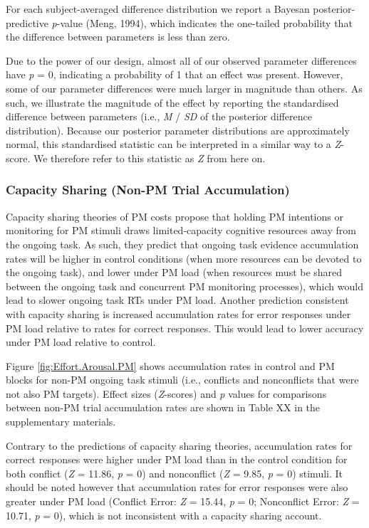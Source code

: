 \documentclass[11pt,]{article}
\begin{document}
For each subject-averaged difference distribution we report a Bayesan
posterior-predictive \emph{p}-value (Meng, 1994), which indicates the
one-tailed probability that the difference between parameters is less
than zero.

Due to the power of our design, almost all of our observed parameter
differences have \emph{p} = 0, indicating a probability of 1 that an
effect was present. However, some of our parameter differences were much
larger in magnitude than others. As such, we illustrate the magnitude of
the effect by reporting the standardised difference between parameters
(i.e., \emph{M} / \emph{SD} of the posterior difference distribution).
Because our posterior parameter distributions are approximately normal,
this standardised statistic can be interpreted in a similar way to a
\emph{Z}-score. We therefore refer to this statistic as \emph{Z} from
here on.

\subsubsection{Capacity Sharing (Non-PM Trial
Accumulation)}\label{capacity-sharing-non-pm-trial-accumulation}

Capacity sharing theories of PM costs propose that holding PM intentions
or monitoring for PM stimuli draws limited-capacity cognitive resources
away from the ongoing task. As such, they predict that ongoing task
evidence accumulation rates will be higher in control conditions (when
more resources can be devoted to the ongoing task), and lower under PM
load (when resources must be shared between the ongoing task and
concurrent PM monitoring processes), which would lead to slower ongoing
task RTs under PM load. Another prediction consistent with capacity
sharing is increased accumulation rates for error responses under PM
load relative to rates for correct responses. This would lead to lower
accuracy under PM load relative to control.

Figure \ref{fig:Effort.Arousal.PM} shows accumulation rates in control
and PM blocks for non-PM ongoing task stimuli (i.e., conflicts and
nonconflicts that were not also PM targets). Effect sizes
(\emph{Z}-scores) and \emph{p} values for comparisons between non-PM
trial accumulation rates are shown in Table XX in the supplementary
materials.

Contrary to the predictions of capacity sharing theories, accumulation
rates for correct responses were higher under PM load than in the
control condition for both conflict (\emph{Z} = 11.86, \emph{p} = 0) and
nonconflict (\emph{Z} = 9.85, \emph{p} = 0) stimuli. It should be noted
however that accumulation rates for error responses were also greater
under PM load (Conflict Error: \emph{Z} = 15.44, \emph{p} = 0;
Nonconflict Error: \emph{Z} = 10.71, \emph{p} = 0), which is not
inconsistent with a capacity sharing account.
\end{document}
